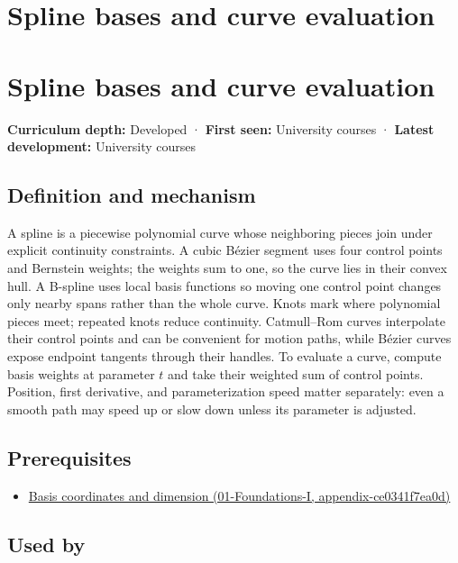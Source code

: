 \hypertarget{appendix-f28eeec97a3d}{}
\section*{Spline bases and curve evaluation}
\section{Spline bases and curve evaluation}\label{appendix-f28eeec97a3d-spline-bases-and-curve-evaluation}

\textbf{Curriculum depth:} Developed · \textbf{First seen:} University courses · \textbf{Latest development:} University courses

\subsection{Definition and mechanism}\label{appendix-f28eeec97a3d-definition-and-mechanism}

A spline is a piecewise polynomial curve whose neighboring pieces join under explicit continuity constraints. A cubic Bézier segment uses four control points and Bernstein weights; the weights sum to one, so the curve lies in their convex hull. A B-spline uses local basis functions so moving one control point changes only nearby spans rather than the whole curve. Knots mark where polynomial pieces meet; repeated knots reduce continuity. Catmull--Rom curves interpolate their control points and can be convenient for motion paths, while Bézier curves expose endpoint tangents through their handles. To evaluate a curve, compute basis weights at parameter \(t\) and take their weighted sum of control points. Position, first derivative, and parameterization speed matter separately: even a smooth path may speed up or slow down unless its parameter is adjusted.

\subsection{Prerequisites}\label{appendix-f28eeec97a3d-prerequisites}

\begin{itemize}
\tightlist
\item
  \href{../01-Foundations-I/main.pdf\#nameddest=appendix-ce0341f7ea0d}{Basis coordinates and dimension (01-Foundations-I, appendix-ce0341f7ea0d)}
\end{itemize}

\subsection{Used by}\label{appendix-f28eeec97a3d-used-by}

